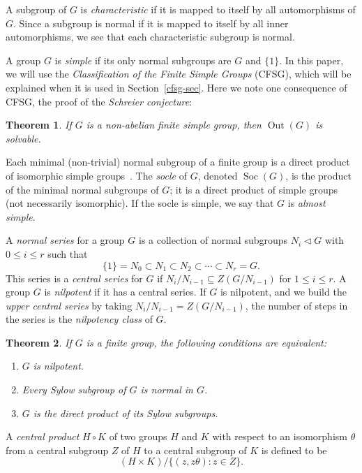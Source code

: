 \documentclass{elsarticle}
\newtheorem{theorem}{Theorem}[section]
\newcommand{\Soc}{\mathop{\mathrm{Soc}}}
\newcommand{\Out}{\mathop{\mathrm{Out}}}
\begin{document}
A subgroup of $G$ is \emph{characteristic} if it is mapped to itself by all
automorphisms of $G$. Since a subgroup is normal if it is mapped to itself
by all inner automorphisms, we see that each characteristic subgroup is normal.

A group $G$ is \emph{simple} if its only normal subgroups are $G$ and $\{1\}$.
In this paper, we will use the \emph{Classification of the Finite Simple Groups}
(CFSG), which will be explained when it is used in
Section~\ref{cfsg-sec}. Here we note one
consequence of CFSG, the proof of the \emph{Schreier conjecture}:

\begin{theorem}\label{schreier}
If $G$ is a non-abelian finite simple group, then $\Out(G)$ is solvable.
\end{theorem}

Each minimal (non-trivial) normal subgroup of a finite group is a direct
product of isomorphic simple groups~\cite[Theorem 4.3A(iii)]{DM}.
The \emph{socle} of $G$, denoted $\Soc(G)$, is the product of the minimal
normal subgroups of $G$; it is a direct product of simple groups (not
necessarily isomorphic). If the socle is simple, we say that $G$ is
\emph{almost simple}.

A {\em normal series} for
a group $G$ is a collection of normal subgroups $N_i\lhd G$ with $0\le i\le
r$ such that
\[
\{1\}=N_0\subset N_1\subset N_2\subset\cdots \subset N_r=G.
\]
This series is a {\em central series} for $G$ if
$N_i/N_{i-1}\subseteq Z(G/N_{i-1})$ for $1\le i\le r$. A group $G$ is
\emph{nilpotent} if it has a central series. If $G$ is nilpotent, and we
build the \emph{upper central series} by taking
$N_i/N_{i-1}=Z(G/N_{i-1})$, the number of steps in the series is the
\emph{nilpotency class} of $G$.

\begin{theorem}\rm{\cite[Theorem 1.26]{isaacs}}
If $G$ is a finite group, the following conditions are equivalent:
\begin{enumerate}
\item $G$ is nilpotent.
\item Every Sylow subgroup of $G$ is normal in $G$.
\item $G$ is the direct product of its Sylow subgroups.
\end{enumerate}
\end{theorem}

A \emph{central product} $H\circ K$ of two groups $H$ and $K$ with respect to an
isomorphism $\theta$ from a central subgroup $Z$ of $H$ to a central subgroup of
$K$ is defined to be $$(H\times K)/\{(z,z\theta):z\in Z\}.$$
\end{document}
